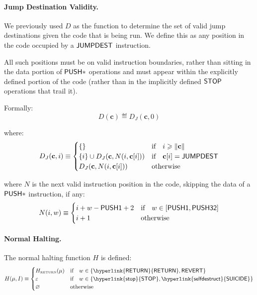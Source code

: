 \paragraph{Jump Destination Validity.}
We previously used $D$ as the function to determine the set of valid jump destinations given the code that is being run. We define this as any position in the code occupied by a  $\mathsf{JUMPDEST}$ instruction.

All such positions must be on valid instruction boundaries, rather than sitting in the data portion of  $\mathsf{PUSH*}$ operations and must appear within the explicitly defined portion of the code (rather than in the implicitly defined \hyperlink{stop}{$\mathsf{STOP}$} operations that trail it).

Formally:
\begin{equation}
D(\mathbf{c}) \eqdef D_{J}(\mathbf{c}, 0)
\end{equation}

where:
\begin{equation}
D_{J}(\mathbf{c}, i) \equiv \begin{cases}
\{\} & \text{if} \quad i \geqslant \lVert \mathbf{c} \rVert  \\
\{ i \} \cup D_{J}(\mathbf{c}, N(i, \mathbf{c}[i])) & \text{if} \quad \mathbf{c}[i] =  \mathsf{JUMPDEST} \\
D_{J}(\mathbf{c}, N(i, \mathbf{c}[i])) & \text{otherwise} \\
\end{cases}
\end{equation}

where $N$ is the next valid instruction position in the code, skipping the data of a  $\mathsf{PUSH*}$ instruction, if any:
\begin{equation}\label{eq:next-instruction}
N(i, w) \equiv \begin{cases}
i + w -  \mathsf{PUSH1} + 2 & \text{if} \quad w \in [ \mathsf{PUSH1},  \mathsf{PUSH32}] \\
i + 1 & \text{otherwise} \end{cases}
\end{equation}

\paragraph{Normal Halting.}\hypertarget{normal_halting_function_H}{}

The normal halting function $H$ is defined:
\begin{equation}
H(\mst, I) \eqdef 
	\begin{cases}
	H_{\text{\tiny RETURN}}(\mst) & \text{if} \quad w \in \{ \op{\hyperlink{RETURN}{RETURN}},  \op{REVERT}\} \\
	\emptystring \quad\quad& \text{if} \quad w \in \{  \op{\hyperlink{stop}{STOP}},  \op{\hyperlink{selfdestruct}{SUICIDE}} \} \\
	\varnothing \quad\quad& \text{otherwise}
	\end{cases}
\end{equation}

